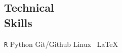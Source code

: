 \documentclass[margin,line]{res}
\begin{document}
\begin{resume}
\vspace{3ex}

\section{\sc Technical\\ Skills}
\verb|R|  \hspace{2ex} Python   \hspace{2ex} Git/Github \hspace{2ex}
Linux \hspace{2ex} \, \LaTeX 

\end{resume}
\end{document}

